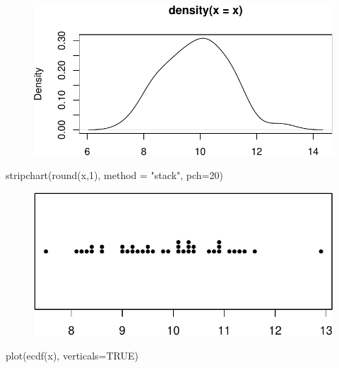 \documentclass[
  letterpaper,
  DIV=11,
  numbers=noendperiod]{scrreprt}
\newenvironment{Shaded}{\begin{snugshade}}{\end{snugshade}}
\newcommand{\AttributeTok}[1]{\textcolor[rgb]{0.40,0.45,0.13}{#1}}
\newcommand{\ConstantTok}[1]{\textcolor[rgb]{0.56,0.35,0.01}{#1}}
\newcommand{\DecValTok}[1]{\textcolor[rgb]{0.68,0.00,0.00}{#1}}
\newcommand{\FunctionTok}[1]{\textcolor[rgb]{0.28,0.35,0.67}{#1}}
\newcommand{\NormalTok}[1]{\textcolor[rgb]{0.00,0.23,0.31}{#1}}
\newcommand{\StringTok}[1]{\textcolor[rgb]{0.13,0.47,0.30}{#1}}
\begin{document}
\begin{figure}[H]

{\centering \includegraphics{0-R-tidyverse_files/figure-pdf/unnamed-chunk-18-4.pdf}

}

\end{figure}

\begin{Shaded}
\begin{Highlighting}[]
\FunctionTok{stripchart}\NormalTok{(}\FunctionTok{round}\NormalTok{(x,}\DecValTok{1}\NormalTok{), }\AttributeTok{method =} \StringTok{"stack"}\NormalTok{, }\AttributeTok{pch=}\DecValTok{20}\NormalTok{)}
\end{Highlighting}
\end{Shaded}

\begin{figure}[H]

{\centering \includegraphics{0-R-tidyverse_files/figure-pdf/unnamed-chunk-18-5.pdf}

}

\end{figure}

\begin{Shaded}
\begin{Highlighting}[]
\FunctionTok{plot}\NormalTok{(}\FunctionTok{ecdf}\NormalTok{(x), }\AttributeTok{verticals=}\ConstantTok{TRUE}\NormalTok{)}
\end{Highlighting}
\end{Shaded}
\end{document}
